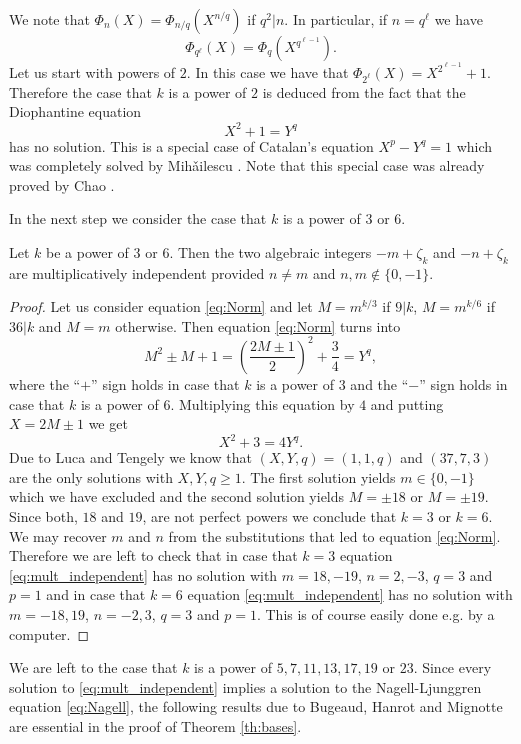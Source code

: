 We note that
$\Phi_n(X)=\Phi_{n/q}(X^{n/q})$ if $q^2|n$. In particular, if $n=q^\ell$ we have
\begin{equation}\label{eq:PowerRed}
\Phi_{q^{\ell}}(X)=\Phi_q\left(X^{q^{\ell -1}}\right). 
\end{equation}
Let us start with powers of $2$. In this case we have that
$\Phi_{2^\ell}(X)=X^{2^{\ell -1}}+1$. Therefore the case that $k$ is a
power of $2$ is deduced from the fact that the Diophantine equation
$$X^2+1=Y^q$$
has no solution. This is a special case of Catalan's equation
$X^p-Y^q=1$ which was completely solved by Mih{\v{a}}ilescu
\cite{Mihailescu:2004}. Note that this special case was already proved
by Chao \cite{Chao:1965}.

In the next step we consider the case that $k$ is a power of $3$ or $6$.

\begin{lemma}\label{lem:k=3}
Let $k$ be a power of $3$ or $6$. Then the two algebraic integers $-m+\zeta_k$ and 
$-n+\zeta_k$ are multiplicatively independent provided $n\neq m$ and $n,m\not\in\{0,-1\}$.
\end{lemma}

\begin{proof}
  Let us consider equation \eqref{eq:Norm} and let $M=m^{k/3}$ if
  $9|k$, $M=m^{k/6}$ if $36|k$ and $M=m$ otherwise. Then equation
  \eqref{eq:Norm} turns into
  \[M^2\pm M+1=\left(\frac{2M\pm 1}2\right)^2+\frac 34=Y^q,\] where
  the ``$+$'' sign holds in case that $k$ is a power of $3$ and the
  ``$-$'' sign holds in case that $k$ is a power of $6$.  Multiplying
  this equation by $4$ and putting $X=2M\pm 1$ we get
  \[X^2+3=4Y^q.\] Due to Luca and Tengely \cite{Luca:2009} we know
  that $(X,Y,q)=(1,1,q)$ and $(37,7,3)$ are the only solutions with
  $X,Y,q\geq 1$. The first solution yields $m\in\{0,-1\}$ which we
  have excluded and the second solution yields $M=\pm 18$ or $M=\pm
  19$. Since both, $18$ and $19$, are not perfect powers we conclude
  that $k=3$ or $k=6$.  We may recover $m$ and $n$ from the
  substitutions that led to equation \eqref{eq:Norm}. Therefore we are
  left to check that in case that $k=3$ equation
  \eqref{eq:mult_independent} has no solution with $m=18,-19$,
  $n=2,-3$, $q=3$ and $p=1$ and in case that $k=6$ equation
  \eqref{eq:mult_independent} has no solution with $m=-18,19$,
  $n=-2,3$, $q=3$ and $p=1$. This is of course easily done e.g. by a
  computer.
\end{proof}

We are left to the case that $k$ is a power of $5,7,11,13,17,19$ or
$23$. Since every solution to \eqref{eq:mult_independent} implies a
solution to the Nagell-Ljunggren equation \eqref{eq:Nagell}, the
following results due to Bugeaud, Hanrot and Mignotte \cite[Theorem 1
and 2]{Bugeaud:2002} are essential in the proof of Theorem
\ref{th:bases}.

